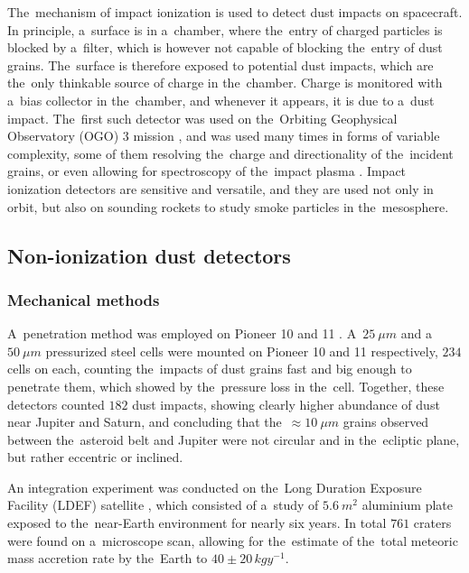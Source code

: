 The~mechanism of impact ionization is used to detect dust impacts on spacecraft. In principle, a~surface is in a~chamber, where the~entry of charged particles is blocked by a~filter, which is however not capable of blocking the~entry of dust grains. The~surface is therefore exposed to potential dust impacts, which are the~only thinkable source of charge in the~chamber. Charge is monitored with a~bias collector in the~chamber, and whenever it appears, it is due to a~dust impact. The~first such detector was used on the~Orbiting Geophysical Observatory ({OGO}) 3 mission \citep{alexander1968zodiacal}, and was used many times in forms of variable complexity, some of them resolving the~charge and directionality \citep{grun1992galileo,grun1992ulysses,berg1969pioneer} of the~incident grains, or even allowing for spectroscopy of the~impact plasma \citep{srama2004cassini,sommer2023measuring}. Impact ionization detectors are sensitive and versatile, and they are used not only in orbit, but also on sounding rockets \citep{gunnarsdottir2019charging,trollvik2019observation} to study smoke particles in the~mesosphere. 

\subsection{Non-ionization dust detectors}

\subsubsection{Mechanical methods} 

A~penetration method was employed on Pioneer 10 and 11 \citep{humes1980results}. A~$\SI{25}{\mu m}$ and a~$\SI{50}{\mu m}$ pressurized steel cells were mounted on Pioneer 10 and 11 respectively, $234$ cells on each, counting the~impacts of dust grains fast and big enough to penetrate them, which showed by the~pressure loss in the~cell. Together, these detectors counted $182$ dust impacts, showing clearly higher abundance of dust near Jupiter and Saturn, and concluding that the~$\approx \SI{10}{\mu m}$ grains observed between the~asteroid belt and Jupiter were not circular and in the~ecliptic plane, but rather eccentric or inclined. 

An integration experiment was conducted on the~Long Duration Exposure Facility ({LDEF}) satellite \citep{love1993direct}, which consisted of a~study of $\SI{5.6}{m^2}$ aluminium plate exposed to the~near-Earth environment for nearly six years. In total $761$ craters were found on a~microscope scan, allowing for the~estimate of the~total meteoric mass accretion rate by the~Earth to $40 \pm 20 \, \si{kg y^{-1}}$. 

